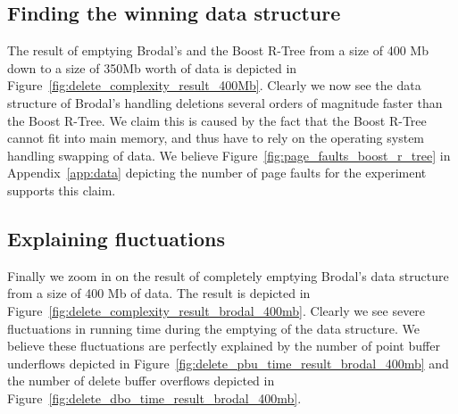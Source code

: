 \documentclass[twoside,11pt,openright]{report}
\begin{document}
\subsection*{Finding the winning data structure}

The result of emptying Brodal's and the Boost R-Tree from a size of 400 Mb down to a size of 350Mb worth of data is depicted in Figure~\ref{fig:delete_complexity_result_400Mb}. Clearly we now see the data structure of Brodal's handling deletions several orders of magnitude faster than the Boost R-Tree. We claim this is caused by the fact that the Boost R-Tree cannot fit into main memory, and thus have to rely on the operating system handling swapping of data. We believe Figure~\ref{fig:page_faults_boost_r_tree} in Appendix~\ref{app:data} depicting the number of page faults for the experiment supports this claim.

\subsection*{Explaining fluctuations}

Finally we zoom in on the result of completely emptying Brodal's data structure from a size of 400 Mb of data. The result is depicted in Figure~\ref{fig:delete_complexity_result_brodal_400mb}. Clearly we see severe fluctuations in running time during the emptying of the data structure. We believe these fluctuations are perfectly explained by the number of point buffer underflows depicted in Figure~\ref{fig:delete_pbu_time_result_brodal_400mb} and the number of delete buffer overflows depicted in Figure~\ref{fig:delete_dbo_time_result_brodal_400mb}.
\end{document}

